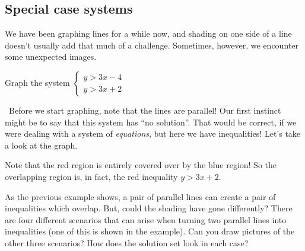 \subsection{Special case systems}

We have been graphing lines for a while now, and shading on one side of a line doesn't usually add that much of a challenge. Sometimes, however, we encounter some unexpected images.

\begin{boxex}

 Graph the system $\left\{\begin{aligned} y>3x-4 \\ y>3x+2 \end{aligned}\right.$

\exsoln\ Before we start graphing, note that the lines are parallel! Our first instinct might be to say that this system has ``no solution''. That would be correct, if we were dealing with a system of \textit{equations}, but here we have inequalities! Let's take a look at the graph.

\begin{center}
\end{center}

Note that the red region is entirely covered over by the blue region! So the overlapping region is, in fact, the red inequality $y> 3x+2$.
\end{boxex}

As the previous example shows, a pair of parallel lines can create a pair of inequalities which overlap. But, could the shading have gone differently? There are four different scenarios that can arise when turning two parallel lines into inequalities (one of this is shown in the example). Can you draw pictures of the other three scenarios? How does the solution set look in each case?

